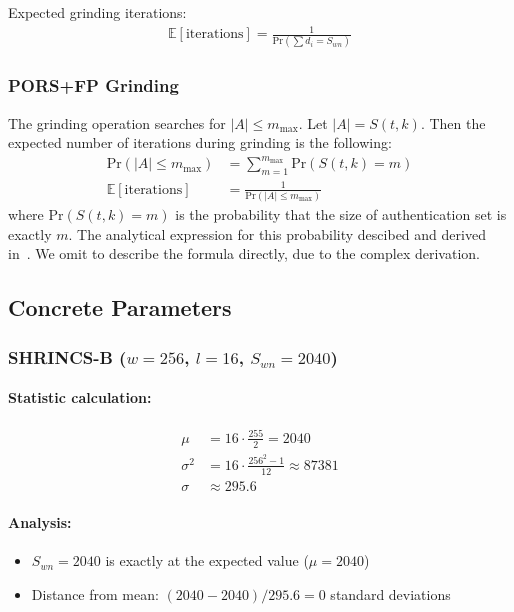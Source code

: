Expected grinding iterations:
\begin{align}
    \mathbb{E}[\text{iterations}] = \frac{1}{\text{Pr}(\sum d_i = S_{wn})}
\end{align}

\subsubsection{PORS+FP Grinding}
The grinding operation searches for $|A| \le m_{\max}$. Let $|A| = S(t,k)$. Then the expected number of iterations during grinding is the following:
\begin{align}
    \text{Pr}(|A| \le m_{\max}) &= \sum_{m=1}^{m_{\max}} \text{Pr}(S(t,k) = m)\\
    \mathbb{E}[\text{iterations}] &= \frac{1}{\text{Pr}\left(|A| \le m_{\max}\right)}
\end{align}
where $\text{Pr}(S(t,k) = m)$ is the probability that the size of authentication set is exactly $m$. 
The analytical expression for this probability descibed and derived in~\cite{pors_fp2025}.
We omit to describe the formula directly, due to the complex derivation.

\subsection{Concrete Parameters}

\subsubsection{SHRINCS-B ($w=256$, $l=16$, $S_{wn}=2040$)}
\paragraph{Statistic calculation:}
\begin{align}
    \mu &= 16 \cdot \frac{255}{2} = 2040 \\
    \sigma^2 &= 16 \cdot \frac{256^2-1}{12} \approx 87381 \\
    \sigma &\approx 295.6
\end{align}

\paragraph{Analysis:}
\begin{itemize}
    \item $S_{wn} = 2040$ is exactly at the expected value ($\mu = 2040$)
    \item Distance from mean: $(2040 - 2040)/295.6 = 0$ standard deviations
\end{itemize}

